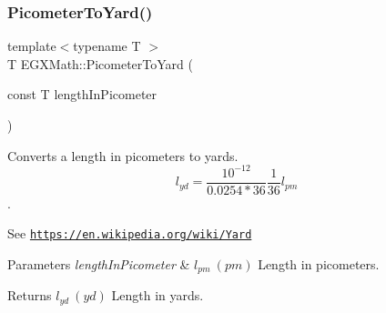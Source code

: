 \subsubsection{\texorpdfstring{Picometer\+To\+Yard()}{PicometerToYard()}}
{\footnotesize\ttfamily template$<$typename T $>$ \\
T E\+G\+X\+Math\+::\+Picometer\+To\+Yard (\begin{DoxyParamCaption}\item[{const T}]{length\+In\+Picometer }\end{DoxyParamCaption})}



Converts a length in picometers to yards. \[ l_{yd}= \frac{10^{-12}}{0.0254 * 36} \frac{1}{36} l_{pm} \]. 

See \href{https://en.wikipedia.org/wiki/Yard}{\tt https\+://en.\+wikipedia.\+org/wiki/\+Yard} 
\begin{DoxyParams}{Parameters}
{\em length\+In\+Picometer} & $ l_{pm}\ (pm)$ Length in picometers. \\
\hline
\end{DoxyParams}
\begin{DoxyReturn}{Returns}
$ l_{yd}\ (yd)$ Length in yards. 
\end{DoxyReturn}
